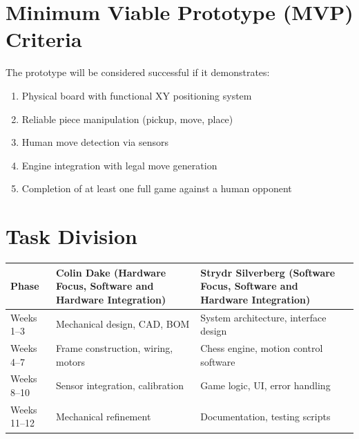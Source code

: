 \documentclass[11pt]{article}
\begin{document}
\vspace{1em}

\section{Minimum Viable Prototype (MVP) Criteria}

The prototype will be considered successful if it demonstrates:

\begin{enumerate}[noitemsep]
    \item Physical board with functional XY positioning system
    \item Reliable piece manipulation (pickup, move, place)
    \item Human move detection via sensors
    \item Engine integration with legal move generation
    \item Completion of at least one full game against a human opponent
\end{enumerate}

\vspace{1em}

\section{Task Division}

\begin{tabularx}{\textwidth}{l X X}
\toprule
\textbf{Phase} & \textbf{Colin Dake (Hardware Focus, Software and Hardware Integration)} & \textbf{Strydr Silverberg (Software Focus, Software and Hardware Integration)} \\
\midrule
Weeks 1--3 & Mechanical design, CAD, BOM & System architecture, interface design \\
Weeks 4--7 & Frame construction, wiring, motors & Chess engine, motion control software \\
Weeks 8--10 & Sensor integration, calibration & Game logic, UI, error handling \\
Weeks 11--12 & Mechanical refinement & Documentation, testing scripts \\
\bottomrule
\end{tabularx}

\vspace{2em}
\end{document}

